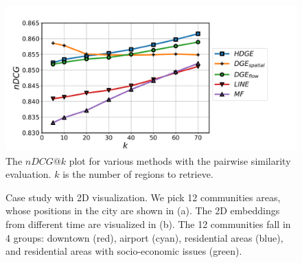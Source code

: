 \begin{figure}[h]
\centering
\includegraphics[width=0.8\linewidth]{fig/pairwise-similarity.pdf}
\caption{The $nDCG@k$ plot for various methods with the pairwise similarity evaluation. $k$ is the number of regions to retrieve.}
\label{fig:pairwise-eval}
\end{figure}

\begin{figure}[t]
\centering
{}
\caption{Case study with 2D visualization. We pick 12 communities areas, whose positions in the city  are shown in (a). The 2D embeddings from different time are visualized in (b). The 12 communities fall in 4 groups: downtown (red), airport (cyan), residential areas (blue), and residential areas with socio-economic issues (green).}
\label{fig:case-study}
\end{figure}


